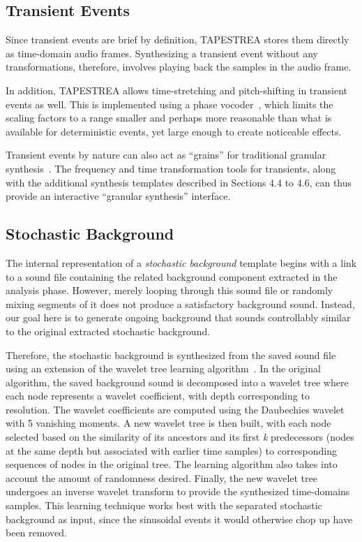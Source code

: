 \documentclass[10pt,letterpaper]{article}
\begin{document}
\subsection{Transient Events} 

Since transient events are brief by definition, TAPESTREA stores them
directly as time-domain audio frames. Synthesizing a transient event
without any transformations, therefore, involves playing back the
samples in the audio frame. 

In addition, TAPESTREA allows time-stretching and pitch-shifting in
transient events as well. This is implemented using a phase
vocoder~\cite{Dolson86}, which limits the scaling factors to a range smaller
and perhaps more reasonable than what is available for deterministic events,
yet large enough to create noticeable effects.

Transient events by nature can also act as ``grains'' for traditional
granular synthesis~\cite{Truax88,Truax90,Roads02}. The
frequency and time transformation tools for transients, along with the
additional synthesis templates described in Sections 4.4 to 4.6, can
thus provide an interactive ``granular synthesis'' interface.

\subsection{Stochastic Background}

The internal representation of a \textit{stochastic background} template
begins with a link to a sound file containing the related background
component extracted in the analysis phase. However, merely looping
through this sound file or randomly mixing segments of it does not
produce a satisfactory background sound. Instead, our goal here is to
generate ongoing background that sounds controllably similar to the
original extracted stochastic background. 

Therefore, the stochastic background is synthesized from the saved sound
file using an extension of the wavelet tree learning
algorithm~. In the original algorithm, the saved
background sound is decomposed into a wavelet tree where each node
represents a wavelet coefficient, with depth corresponding to resolution.
The wavelet coefficients are computed using the Daubechies wavelet with 5
vanishing moments. A new wavelet tree is then built, with each node selected
based on the similarity of its ancestors and its first \textit{k} predecessors
(nodes at the same depth but associated with earlier time samples) to
corresponding sequences of nodes in the original tree. The learning
algorithm also takes into account the amount of randomness desired. Finally,
the new wavelet tree undergoes an inverse wavelet transform to provide the
synthesized time-domains samples. This learning technique works best with
the separated stochastic background as input, since the sinusoidal events it
would otherwise chop up have been removed.
\end{document}
